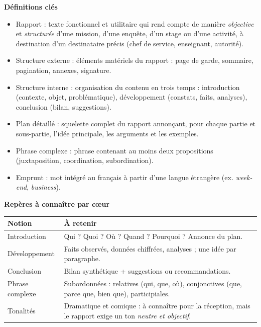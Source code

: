\documentclass[11pt]{article}
\newcommand{\cle}[1]{{\popxbold\color{popdark}#1}}
\begin{document}
\begin{bilan}
\textbf{Définitions clés}
\begin{itemize}
  \item \cle{Rapport} : texte fonctionnel et utilitaire qui rend compte de manière \emph{objective} et \emph{structurée} d'une mission, d'une enquête, d'un stage ou d'une activité, à destination d'un destinataire précis (chef de service, enseignant, autorité).
  \item \cle{Structure externe} : éléments matériels du rapport : page de garde, sommaire, pagination, annexes, signature.
  \item \cle{Structure interne} : organisation du contenu en trois temps : introduction (contexte, objet, problématique), développement (constats, faits, analyses), conclusion (bilan, suggestions).
  \item \cle{Plan détaillé} : squelette complet du rapport annonçant, pour chaque partie et sous-partie, l'idée principale, les arguments et les exemples.
  \item \cle{Phrase complexe} : phrase contenant au moins deux propositions (juxtaposition, coordination, subordination).
  \item \cle{Emprunt} : mot intégré au français à partir d'une langue étrangère (ex. \emph{week-end}, \emph{business}).
\end{itemize}

\textbf{Repères à connaître par cœur}
\begin{center}
\begin{tabularx}{\linewidth}{|l|X|}
\hline
\rowcolor{popblueL} \textbf{Notion} & \textbf{À retenir} \\
\hline
Introduction & Qui ? Quoi ? Où ? Quand ? Pourquoi ? Annonce du plan. \\
\hline
Développement & Faits observés, données chiffrées, analyses ; une idée par paragraphe. \\
\hline
Conclusion & Bilan synthétique + suggestions ou recommandations. \\
\hline
Phrase complexe & Subordonnées : relatives (qui, que, où), conjonctives (que, parce que, bien que), participiales. \\
\hline
Tonalités & Dramatique et comique : à connaître pour la réception, mais le rapport exige un ton \emph{neutre et objectif}. \\
\hline
\end{tabularx}
\end{center}


\end{bilan}
\end{document}
